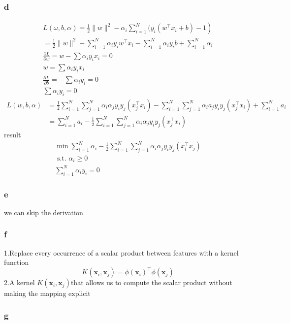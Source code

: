 \documentclass{article}
\begin{document}
\subsubsection{d}
$$\begin{array}{c}
\left.L(\omega, b, \alpha)=\frac{1}{2}\|w\|^{2}-\alpha_{i} \sum_{i=1}^{N} ( y_{i}\left(w^{\top} x_{i}+b\right)-1\right) \\
=\frac{1}{2}\|w\|^{2}-\sum_{i=1}^{N} \alpha_{i} y_{i} w^{\top} x_{i}-\sum_{i=1}^{N} \alpha_{i} y_i b+\sum_{i=1}^{N} \alpha_{i} \\
\frac{\partial L}{\partial w}=w-\sum \alpha_{i} y_{i} x_{i}=0 \\
w=\sum \alpha_{i} y_{i} x_{i} \\
\frac{\partial L}{\partial b}=-\sum \alpha_{i} y_{i}=0 \\
\sum \alpha_{i} y_{i}=0
\end{array}$$
$$\begin{aligned}
L(w, b, \alpha) &=\frac{1}{2} \sum_{i=1}^{N} \sum_{j=1}^{N} \alpha_{i} \alpha_{j} y_{i} y_{j}\left(x_{j}^{\top} x_{i}\right)-\sum_{i=1}^{N} \sum_{j=1}^{N} \alpha_{i} a_{j} y_{i} y_{j}\left(x_{j}^{\top} x_{i}\right)+\sum_{i=1}^{N} a_{i} \\
&=\sum_{i=1}^{N} a_{i}-\frac{1}{2} \sum_{i=1}^{N} \sum_{j=1}^{N} \alpha_{i} \alpha_{j} y_{i} y_{j}\left(x_{j}^{\top} x_{i}\right)
\end{aligned}$$
result
$$\begin{aligned}
\min \sum_{i=1}^{N} \alpha_{i}-\frac{1}{2} \sum_{i=1}^{N} \sum_{j=1}^{N} \alpha_{i} \alpha_{j} y_{i} y_{j}\left(x_{i}^{\top} x_{j}\right) \\
\text { s.t. } \alpha_{i} \geqslant 0 \\
\sum_{i=1}^{N} \alpha_{i} y_{i}=0
\end{aligned}$$
\subsubsection{e}
we can skip the derivation
\subsubsection{f}
1.Replace every occurrence of a scalar product between features with a kernel function
$$K\left(\mathbf{x}_{i}, \mathbf{x}_{j}\right)=\phi\left(\mathbf{x}_{i}\right)^{\top} \phi\left(\mathbf{x}_{j}\right)$$
2.A kernel $K\left(\mathbf{x}_{i}, \mathbf{x}_{j}\right)$that allows us to compute the
scalar product without making the mapping explicit
\subsubsection{g}
\end{document}
